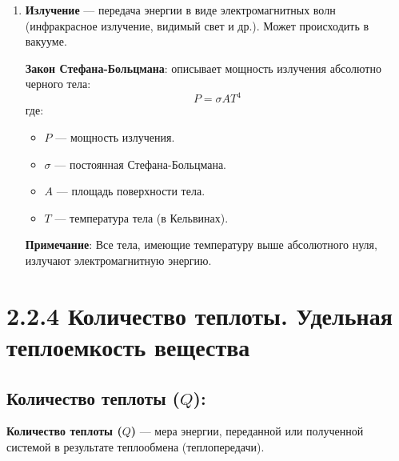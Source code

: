 \documentclass[a4paper,12pt]{article}
\begin{document}
\begin{enumerate}[itemsep=0pt, topsep=0pt, parsep=3pt]
    \item \textbf{Излучение} --- передача энергии в виде электромагнитных волн (инфракрасное излучение, видимый свет и др.). Может происходить в вакууме.
    \par
    \textbf{Закон Стефана-Больцмана}: описывает мощность излучения абсолютно черного тела:
    \vspace{-0.05em}
    $$ P = \sigma A T^4 $$
    где:
    \begin{itemize}
        \item $P$ — мощность излучения.
        \item $\sigma$ — постоянная Стефана-Больцмана.
        \item $A$ — площадь поверхности тела.
        \item $T$ — температура тела (в Кельвинах).
    \end{itemize}
    \vspace{-0.05em}
    \textbf{Примечание}: Все тела, имеющие температуру выше абсолютного нуля, излучают электромагнитную энергию.
\end{enumerate}

\section*{2.2.4 Количество теплоты. Удельная теплоемкость вещества}
\vspace{-9pt}
\subsection*{Количество теплоты ($Q$):}
\vspace{-3pt}
\textbf{Количество теплоты ($Q$)} — мера энергии, переданной или полученной системой в результате теплообмена (теплопередачи).

\vspace{-9pt}
\end{document}
